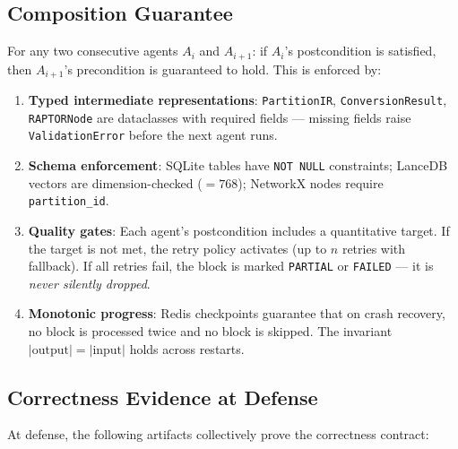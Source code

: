 \documentclass[11pt,a4paper]{article}
\begin{document}
\subsection{Composition Guarantee}

\begin{infobox}
For any two consecutive agents $A_i$ and $A_{i+1}$: if $A_i$'s postcondition is satisfied, then $A_{i+1}$'s precondition is guaranteed to hold. This is enforced by:
\begin{enumerate}[nosep]
    \item \textbf{Typed intermediate representations}: \texttt{PartitionIR}, \texttt{ConversionResult}, \texttt{RAPTORNode} are dataclasses with required fields — missing fields raise \texttt{ValidationError} before the next agent runs.
    \item \textbf{Schema enforcement}: SQLite tables have \texttt{NOT NULL} constraints; LanceDB vectors are dimension-checked ($= 768$); NetworkX nodes require \texttt{partition\_id}.
    \item \textbf{Quality gates}: Each agent's postcondition includes a quantitative target. If the target is not met, the retry policy activates (up to $n$ retries with fallback). If all retries fail, the block is marked \texttt{PARTIAL} or \texttt{FAILED} — it is \emph{never silently dropped}.
    \item \textbf{Monotonic progress}: Redis checkpoints guarantee that on crash recovery, no block is processed twice and no block is skipped. The invariant $|\text{output}| = |\text{input}|$ holds across restarts.
\end{enumerate}
\end{infobox}

\subsection{Correctness Evidence at Defense}

At defense, the following artifacts collectively prove the correctness contract:
\end{document}
